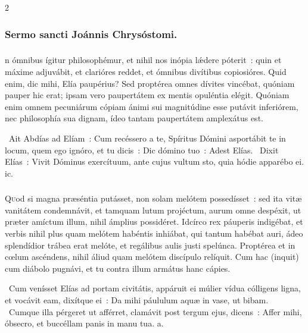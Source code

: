 \documentclass[9pt,twoside]{extarticle}
\begin{document}
\begin{multicols}{2}
{{{\subsubsection*{\center Sermo sancti Joánnis Chrysóstomi.}
\subsubsection*{\center {}}
n ómnibus ígitur philosophémur, et nihil nos inópia lǽdere póterit~: quin et máxime adjuvábit, et clarióres reddet, et ómnibus divítibus copiosióres. Quid enim, dic mihi, Elía paupérius? Sed proptérea omnes dívites vincébat, quóniam pauper hic erat; ipsam vero paupertátem ex mentis opuléntia elégit. Quóniam enim omnem pecuniárum cópiam ánimi sui magnitúdine esse putávit inferiórem, nec philosophía sua dignam, ídeo tantam paupertátem amplexátus est.

\begin{tightlist}{}
\item {}~Ait Abdías ad Elíam~: Cum recéssero a te, Spíritus Dómini asportábit te in locum, quem ego ignóro, et tu dicis~: \textred{*} Dic dómino tuo~: Adest Elías. ~Dixit Elías~: Vivit Dóminus exercítuum, ante cujus vultum sto, quia hódie apparébo ei. ic.
\end{tightlist}

\subsubsection*{\center {}}
\lettrine{Q}uod si magna præséntia putásset, non solam melótem possedísset~: sed ita vitæ vanitátem condemnávit, et tamquam lutum projéctum, aurum omne despéxit, ut præter amíctum illum, nihil ámplius possidéret. Idcírco rex páuperis indigébat, et verbis nihil plus quam melótem habéntis inhiábat, qui tantum habébat auri, ádeo splendídior trábea erat melóte, et regálibus aulis justi spelúnca. Proptérea et in cœlum ascéndens, nihil áliud quam melótem discípulo relíquit. Cum hac (inquit) cum diábolo pugnávi, et tu contra illum armátus hanc cápies.

\begin{tightlist}{}
\item {}~Cum venísset Elías ad portam civitátis, appáruit ei múlier vídua cólligens ligna, et vocávit eam, dixítque ei~: \textred{*} Da mihi páululum aquæ in vase, ut bibam. ~Cumque illa pérgeret ut afférret, clamávit post tergum ejus, dicens~: Affer mihi, óbsecro, et buccéllam panis in manu tua. a.
\end{tightlist}

}}}
\end{multicols}
\end{document}
